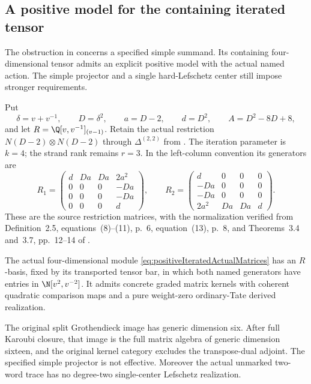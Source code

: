 \subsection{A positive model for the containing iterated tensor}

The obstruction in  concerns a specified simple
summand. Its containing four-dimensional tensor admits
an explicit positive model with the actual named action.
The simple projector and a single hard-Lefschetz center
still impose stronger requirements.

Put
\[
 \delta=v+v^{-1},\qquad D=\delta^2,\qquad
 a=D-2,\qquad d=D^2,\qquad A=D^2-8D+8,
\]
and let \(R=\Q[v,v^{-1}]_{(v-1)}\).
Retain the actual restriction
\(N(D-2)\otimes N(D-2)\) through
\(\Delta^{(2,2)}\) from .
The iteration parameter is \(k=4\); the strand rank
remains \(r=3\).
In the left-column convention its generators are
\begin{equation}\label{eq:positiveIteratedActualMatrices}
 R_1=\begin{pmatrix}
 d&Da&Da&2a^2\\0&0&0&-Da\\0&0&0&-Da\\0&0&0&d
 \end{pmatrix},\qquad
 R_2=\begin{pmatrix}
 d&0&0&0\\-Da&0&0&0\\-Da&0&0&0\\2a^2&Da&Da&d
 \end{pmatrix}.
\end{equation}
These are the source restriction matrices, with the
normalization verified from Definition~2.5,
equations~(8)--(11), p.~6, equation~(13), p.~8,
and Theorems~3.4 and~3.7, pp.~12--14
of \cite{BlasiakChebyshev}.

\begin{finding}
\label{f:iteratedPositiveWholeTensor}
The actual four-dimensional module
\eqref{eq:positiveIteratedActualMatrices} has an
\(R\)-basis, fixed by its transported tensor bar,
in which both named generators have entries in
\(\N[v^2,v^{-2}]\).
It admits concrete graded matrix kernels with coherent
quadratic comparison maps and a pure weight-zero
ordinary-Tate derived realization.

The original split Grothendieck image has generic
dimension six. After full Karoubi closure, that image
is the full matrix algebra of generic dimension
sixteen, and the original kernel category excludes
the transpose-dual adjoint.
The specified simple projector is not effective.
Moreover the actual unmarked two-word trace has no
degree-two single-center Lefschetz realization.
\end{finding}

